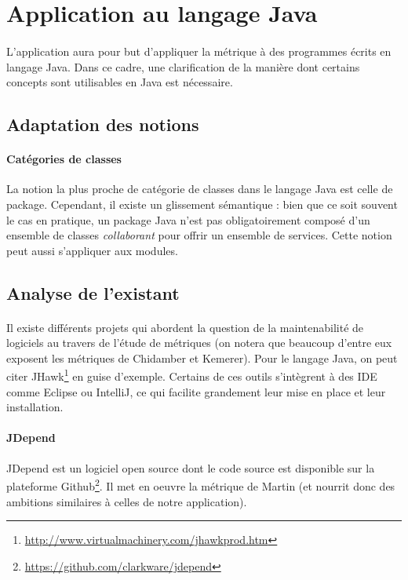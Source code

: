 \documentclass{scrartcl}
\begin{document}
\newpage
    
\section{Application au langage Java}

    \paragraph{}L'application aura pour but d'appliquer la métrique à des programmes écrits en langage Java. Dans ce cadre, une clarification de la manière dont certains concepts sont utilisables en Java est nécessaire.

\subsection{Adaptation des notions}

    \paragraph{Catégories de classes}La notion la plus proche de catégorie de classes dans le langage Java est celle de package. Cependant, il existe un glissement sémantique : bien que ce soit souvent le cas en pratique, un package Java n'est pas obligatoirement composé d'un ensemble de classes \emph{collaborant} pour offrir un ensemble de services. Cette notion peut aussi s'appliquer aux modules.

\subsection{Analyse de l'existant}
    \paragraph{}Il existe différents projets qui abordent la question de la maintenabilité de logiciels au travers de l'étude de métriques (on notera que beaucoup d'entre eux exposent les métriques de Chidamber et Kemerer\cite{ChidamberKemerer:1994}). Pour le langage Java, on peut citer JHawk\footnote{\url{http://www.virtualmachinery.com/jhawkprod.htm}} en guise d'exemple. Certains de ces outils s'intègrent à des IDE comme Eclipse ou IntelliJ, ce qui facilite grandement leur mise en place et leur installation.
    
    \paragraph{JDepend}JDepend est un logiciel open source dont le code source est disponible sur la plateforme Github\footnote{\url{https://github.com/clarkware/jdepend}}. Il met en oeuvre la métrique de Martin (et nourrit donc des ambitions similaires à celles de notre application).
\end{document}
